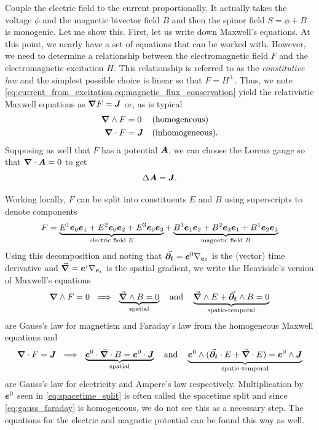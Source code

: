 \documentclass{article}
\begin{document}
Couple the electric field to the current proportionally. It actually takes the voltage $\phi$ and the magnetic bivector field $B$ and then the spinor field $S=\phi +B$ is monogenic. Let me show this. First, let us write down Maxwell's equations. At this point, we nearly have a set of equations that can be worked with. However, we need to determine a relationship between the electromagnetic field $F$ and the electromagnetic excitation $H$. This relationship is referred to as the \emph{constitutive law} and the simplest possible choice is linear so that $F = H^\perp$. Thus, we note \cref{eq:current_from_excitation,eq:magnetic_flux_conservation} yield the relativistic Maxwell equations as $\boldsymbol{\nabla} F = \boldsymbol{J}$ or, as is typical
\begin{align}
	\boldsymbol{\nabla} \wedge F &= 0  &&\textrm{(homogeneous)}\\
	\boldsymbol{\nabla} \cdot F &= \boldsymbol{J} && \textrm{(inhomogeneous)}.
\end{align}
Supposing as well that $F$ has a potential $\boldsymbol{A}$, we can choose the Lorenz gauge so that $\boldsymbol{\nabla} \cdot \boldsymbol{A} = 0$ to get
\begin{equation}
\Delta \boldsymbol{A} = \boldsymbol{J}.
\end{equation}

Working locally, $F$ can be split into constituents $E$ and $B$ using superscripts to denote components
\begin{align}
	F = \underbrace{E^1 \boldsymbol{e}_0 \boldsymbol{e}_1 + E^2 \boldsymbol{e}_0 \boldsymbol{e}_2 + E^3 \boldsymbol{e}_0 \boldsymbol{e}_3}_{\textrm{electric field } E} + \underbrace{B^{3} \boldsymbol{e}_1 \boldsymbol{e}_2 + B^{2} \boldsymbol{e}_3 \boldsymbol{e}_1 + B^{1} \boldsymbol{e}_2 \boldsymbol{e}_3}_{\textrm{magnetic field } B}
\end{align}
Using this decomposition and noting that $\vec{\boldsymbol{\partial_t}}=\boldsymbol{e}^0 \nabla_{\boldsymbol{e}_0}$ is the (vector) time derivative and  $\vec{\boldsymbol{\nabla}} = \boldsymbol{e}^i \nabla_{\boldsymbol{e}_i}$ is the spatial gradient, we write the Heaviside's version of Maxwell's equations
\begin{align}
\label{eq:gauss_faraday}
	\boldsymbol{\nabla} \wedge F=0 ~\implies~ \underbrace{\vec{\boldsymbol{\nabla}} \wedge B = 0}_{\textrm{spatial}} ~~~\textrm{and}~~~ \underbrace{\vec{\boldsymbol{\nabla}} \wedge E + \vec{\boldsymbol{\partial_t}} \wedge B = 0}_{\textrm{spatio-temporal}}
\end{align}
are Gauss's law for magnetism and Faraday's law from the homogeneous Maxwell equations and
\begin{align}
\label{eq:spacetime_split}
	\boldsymbol{\nabla} \cdot F=\boldsymbol{J}~\implies~ \underbrace{\boldsymbol{e}^0 \cdot \vec{\boldsymbol{\nabla}} \cdot B = \boldsymbol{e}^0 \cdot \boldsymbol{J}}_{\textrm{spatial}}~~~\textrm{and}~~~ \underbrace{\boldsymbol{e}^0 \wedge (\vec{\boldsymbol{\partial_t}} \cdot E + \vec{\boldsymbol{\nabla}} \cdot E) = \boldsymbol{e}^0 \wedge \boldsymbol{J}}_{\textrm{spatio-temporal}}
\end{align}
are Gauss's law for electricity and Ampere's law respectively. Multiplication by $\boldsymbol{e}^0$ seen in \cref{eq:spacetime_split} is often called the spacetime split and since \cref{eq:gauss_faraday} is homogeneous, we do not see this as a necessary step. The equations for the electric and magnetic potential can be found this way as well.
\end{document}
